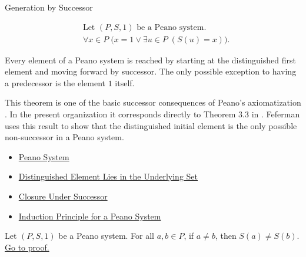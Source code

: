 \begin{topicbox}{Generation by Successor}
\begin{remark*}
\[
\begin{aligned}
&\text{Let } (P,S,1) \text{ be a Peano system.}\\
&\forall x \in P\;\bigl(x=1 \lor \exists u \in P\;(S(u)=x)\bigr).
\end{aligned}
\]
\end{remark*}

\begin{remark*}[Interpretation]
Every element of a Peano system is reached by starting at the distinguished
first element and moving forward by successor. The only possible exception to
having a predecessor is the element $1$ itself.
\end{remark*}

\begin{remark*}
This theorem is one of the basic successor consequences of Peano's
axiomatization \citep{PeanoArithmeticesPrincipia1889}. In the present
organization it corresponds directly to Theorem 3.3 in
\citet{FefermanNumberSystems1964}. Feferman uses this result to show that
the distinguished initial element is the only possible non-successor in a
Peano system.
\end{remark*}

\begin{dependencies}
\begin{itemize}
  \item \hyperref[def:peano-system]{Peano System}
  \item \hyperref[ax:peano-one-in-n]{Distinguished Element Lies in the Underlying Set}
  \item \hyperref[ax:peano-successor-closure]{Closure Under Successor}
  \item \hyperref[thm:induction-principle-for-peano-system]{Induction Principle for a Peano System}
\end{itemize}
\end{dependencies}

\begin{tcolorbox}[colback=thmbox, colframe=thmborder, arc=2pt,
  left=6pt, right=6pt, top=4pt, bottom=4pt,
  title={\small\textbf{Theorem (Successor Inequality Reflection)}} ,
  fonttitle=\small\bfseries]
\begin{theorem}
\label{thm:successor-inequality-reflection}
Let $(P,S,1)$ be a Peano system. For all $a,b \in P$, if $a \neq b$, then
$S(a)\neq S(b)$.
\hyperref[prf:successor-inequality-reflection]{Go to proof.}
\end{theorem}
\end{tcolorbox}


\end{topicbox}

